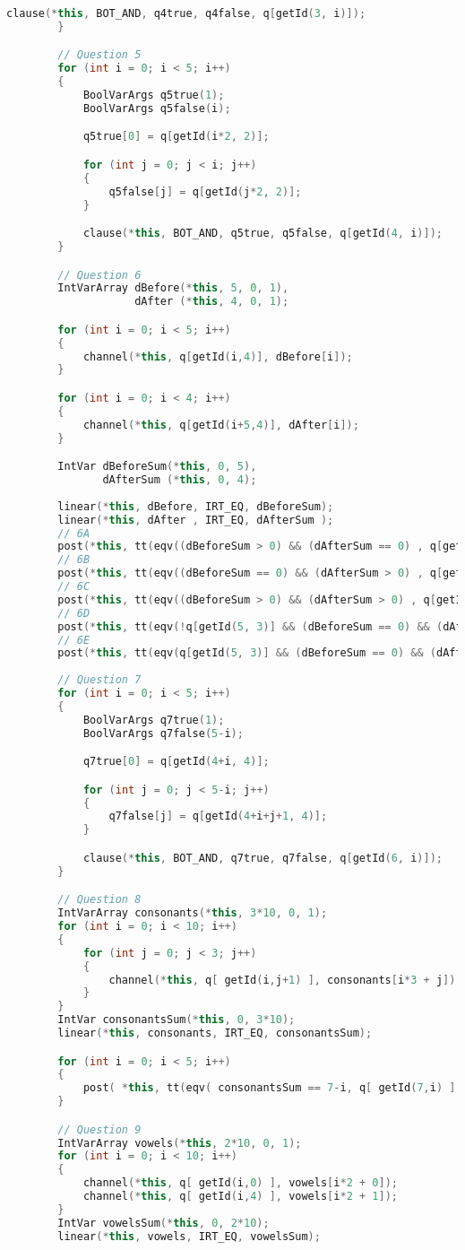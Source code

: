 \begin{lstlisting}[language=C++]
			clause(*this, BOT_AND, q4true, q4false, q[getId(3, i)]);
		}

		// Question 5
		for (int i = 0; i < 5; i++)
		{
			BoolVarArgs q5true(1);
			BoolVarArgs q5false(i);

			q5true[0] = q[getId(i*2, 2)];

			for (int j = 0; j < i; j++)
			{
				q5false[j] = q[getId(j*2, 2)];
			}

			clause(*this, BOT_AND, q5true, q5false, q[getId(4, i)]);
		}

		// Question 6
		IntVarArray dBefore(*this, 5, 0, 1),
					dAfter (*this, 4, 0, 1);

		for (int i = 0; i < 5; i++)
		{
			channel(*this, q[getId(i,4)], dBefore[i]);
		}

		for (int i = 0; i < 4; i++)
		{
			channel(*this, q[getId(i+5,4)], dAfter[i]);
		}

		IntVar dBeforeSum(*this, 0, 5),
			   dAfterSum (*this, 0, 4);
		
		linear(*this, dBefore, IRT_EQ, dBeforeSum);
		linear(*this, dAfter , IRT_EQ, dAfterSum );
		// 6A
		post(*this, tt(eqv((dBeforeSum > 0) && (dAfterSum == 0) , q[getId(5, 0)] )));
		// 6B
		post(*this, tt(eqv((dBeforeSum == 0) && (dAfterSum > 0) , q[getId(5, 1)] )));
		// 6C
		post(*this, tt(eqv((dBeforeSum > 0) && (dAfterSum > 0) , q[getId(5, 2)] )));
		// 6D
		post(*this, tt(eqv(!q[getId(5, 3)] && (dBeforeSum == 0) && (dAfterSum == 0) , q[getId(5, 3)] )));
		// 6E
		post(*this, tt(eqv(q[getId(5, 3)] && (dBeforeSum == 0) && (dAfterSum == 0), q[getId(5, 4)])));
		
		// Question 7
		for (int i = 0; i < 5; i++)
		{
			BoolVarArgs q7true(1);
			BoolVarArgs q7false(5-i);

			q7true[0] = q[getId(4+i, 4)];

			for (int j = 0; j < 5-i; j++)
			{
				q7false[j] = q[getId(4+i+j+1, 4)];
			}

			clause(*this, BOT_AND, q7true, q7false, q[getId(6, i)]);
		}

		// Question 8
		IntVarArray consonants(*this, 3*10, 0, 1);
		for (int i = 0; i < 10; i++)
		{
			for (int j = 0; j < 3; j++)
			{
				channel(*this, q[ getId(i,j+1) ], consonants[i*3 + j]);
			}
		}
		IntVar consonantsSum(*this, 0, 3*10);
		linear(*this, consonants, IRT_EQ, consonantsSum); 

		for (int i = 0; i < 5; i++)
		{
			post( *this, tt(eqv( consonantsSum == 7-i, q[ getId(7,i) ] )) );
		}

		// Question 9
		IntVarArray vowels(*this, 2*10, 0, 1);
		for (int i = 0; i < 10; i++)
		{
			channel(*this, q[ getId(i,0) ], vowels[i*2 + 0]);
			channel(*this, q[ getId(i,4) ], vowels[i*2 + 1]);
		}
		IntVar vowelsSum(*this, 0, 2*10);
		linear(*this, vowels, IRT_EQ, vowelsSum); 


\end{lstlisting}
